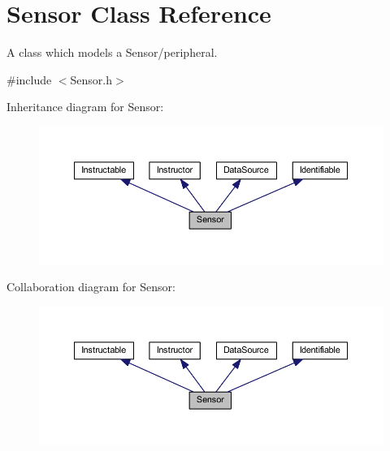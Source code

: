 \hypertarget{class_sensor}{}\section{Sensor Class Reference}
\label{class_sensor}


A class which models a Sensor/peripheral.  




{\ttfamily \#include $<$Sensor.\+h$>$}



Inheritance diagram for Sensor\+:
\nopagebreak
\begin{figure}[H]
\begin{center}
\leavevmode
\includegraphics[width=350pt]{class_sensor__inherit__graph}
\end{center}
\end{figure}


Collaboration diagram for Sensor\+:
\nopagebreak
\begin{figure}[H]
\begin{center}
\leavevmode
\includegraphics[width=350pt]{class_sensor__coll__graph}
\end{center}
\end{figure}
